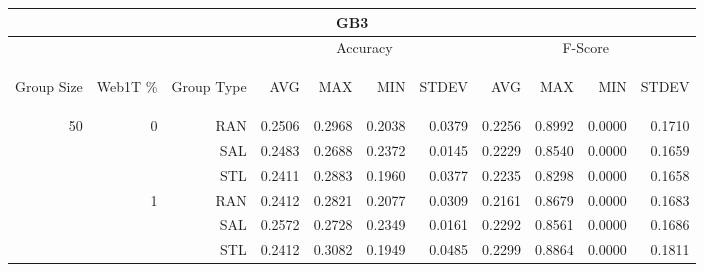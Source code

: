 \begin{center}
\begin{table}[htbp] 
 \begin{center}
\begin{tabular}{ | r | r | r | r | r | r | r | r | r | r | r |}
\hline
\multicolumn{11}{|c|}{GB3}\\
\hline
 & & & \multicolumn{4}{|c|}{Accuracy} & \multicolumn{4}{|c|}{F-Score}\\ \cline{4-11}
\begin{sideways}Group Size\end{sideways} & \begin{sideways}Web1T \%\end{sideways} & \begin{sideways}Group Type\end{sideways} & \begin{sideways}AVG\end{sideways} & \begin{sideways}MAX\end{sideways} & \begin{sideways}MIN\end{sideways} & \begin{sideways}STDEV\end{sideways} & \begin{sideways}AVG\end{sideways} & \begin{sideways}MAX\end{sideways} & \begin{sideways}MIN\end{sideways} & \begin{sideways}STDEV\end{sideways}\\
\hline
\multirow{12}{*}{50}
 & \multirow{3}{*}{0} & RAN & 0.2506 & 0.2968 & 0.2038 & 0.0379 & 0.2256 & 0.8992 & 0.0000 & 0.1710\\ \cline{3-11}
 &   & SAL & 0.2483 & 0.2688 & 0.2372 & 0.0145 & 0.2229 & 0.8540 & 0.0000 & 0.1659\\ \cline{3-11}
 &   & STL & 0.2411 & 0.2883 & 0.1960 & 0.0377 & 0.2235 & 0.8298 & 0.0000 & 0.1658\\ \cline{2-11}
 & \multirow{3}{*}{1} & RAN & 0.2412 & 0.2821 & 0.2077 & 0.0309 & 0.2161 & 0.8679 & 0.0000 & 0.1683\\ \cline{3-11}
 &   & SAL & 0.2572 & 0.2728 & 0.2349 & 0.0161 & 0.2292 & 0.8561 & 0.0000 & 0.1686\\ \cline{3-11}
 &   & STL & 0.2412 & 0.3082 & 0.1949 & 0.0485 & 0.2299 & 0.8864 & 0.0000 & 0.1811\\ \cline{2-11}

\end{tabular}
\end{center}
\end{table}
\end{center}
